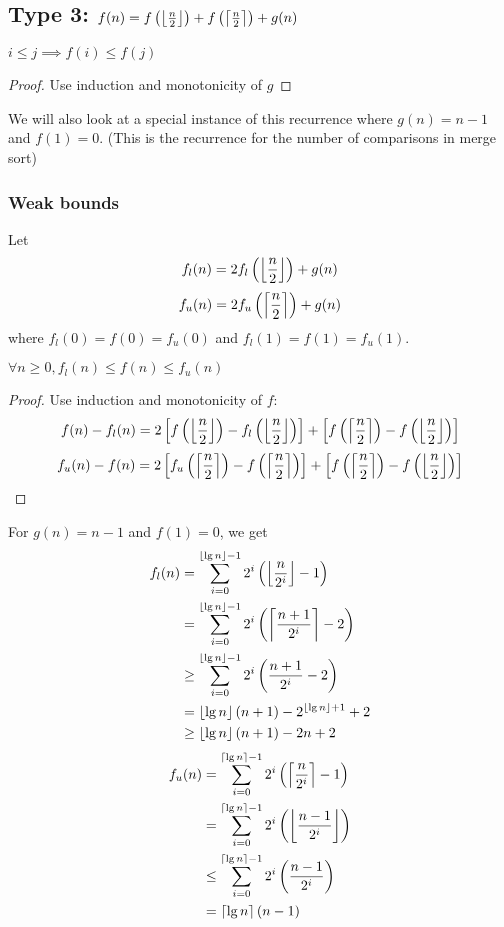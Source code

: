 \subsection[Type 3]{Type 3: $f(n) = f\left(\left\lfloor \frac{n}{2} \right\rfloor\right) + f\left(\left\lceil \frac{n}{2} \right\rceil\right) + g(n)$}

\begin{theorem}[Monotonicity] $i \le j \implies f(i) \le f(j)$ \end{theorem}
\begin{proof} Use induction and monotonicity of $g$ \end{proof}

We will also look at a special instance of this recurrence
where $g(n) = n-1$ and $f(1) = 0$.
(This is the recurrence for the number of comparisons in merge sort)

\subsubsection{Weak bounds}

Let
\[ f_l(n) = 2f_l\left(\left\lfloor \frac{n}{2} \right\rfloor\right) + g(n) \]
\[ f_u(n) = 2f_u\left(\left\lceil \frac{n}{2} \right\rceil\right) + g(n) \]
where $f_l(0) = f(0) = f_u(0)$ and $f_l(1) = f(1) = f_u(1)$.

\begin{theorem}$\forall n \ge 0, f_l(n) \le f(n) \le f_u(n)$\end{theorem}
\begin{proof} Use induction and monotonicity of $f$:
\[ f(n) - f_l(n) = 2\left[ f\left(\left\lfloor \frac{n}{2} \right\rfloor\right) - f_l\left(\left\lfloor \frac{n}{2} \right\rfloor\right) \right]
  + \left[ f\left(\left\lceil \frac{n}{2} \right\rceil\right) - f\left(\left\lfloor \frac{n}{2} \right\rfloor\right) \right] \]
\[ f_u(n) - f(n) = 2\left[ f_u\left(\left\lceil \frac{n}{2} \right\rceil\right) - f\left(\left\lceil \frac{n}{2} \right\rceil\right) \right]
  + \left[ f\left(\left\lceil \frac{n}{2} \right\rceil\right) - f\left(\left\lfloor \frac{n}{2} \right\rfloor\right) \right] \]
\end{proof}

For $g(n) = n-1$ and $f(1) = 0$, we get
\begin{align*}
f_l(n) &= \sum_{i=0}^{\left\lfloor \lg n \right\rfloor-1} 2^i \left( \left\lfloor \frac{n}{2^i} \right\rfloor - 1 \right)
\\ &= \sum_{i=0}^{\left\lfloor \lg n \right\rfloor-1} 2^i \left( \left\lceil \frac{n+1}{2^i} \right\rceil - 2 \right)
\\ &\ge \sum_{i=0}^{\left\lfloor \lg n \right\rfloor-1} 2^i \left( \frac{n+1}{2^i} - 2 \right)
\\ &= \left\lfloor \lg n \right\rfloor(n+1) - 2^{\left\lfloor \lg n \right\rfloor+1} + 2
\\ &\ge \left\lfloor \lg n \right\rfloor(n+1) - 2n + 2
\end{align*}
\begin{align*}
f_u(n) &= \sum_{i=0}^{\left\lceil \lg n \right\rceil-1} 2^i \left( \left\lceil \frac{n}{2^i} \right\rceil - 1 \right)
\\ &= \sum_{i=0}^{\left\lceil \lg n \right\rceil-1} 2^i \left( \left\lfloor \frac{n-1}{2^i} \right\rfloor \right)
\\ &\le \sum_{i=0}^{\left\lceil \lg n \right\rceil-1} 2^i \left( \frac{n-1}{2^i} \right)
\\ &= \left\lceil \lg n \right\rceil(n-1)
\end{align*}

